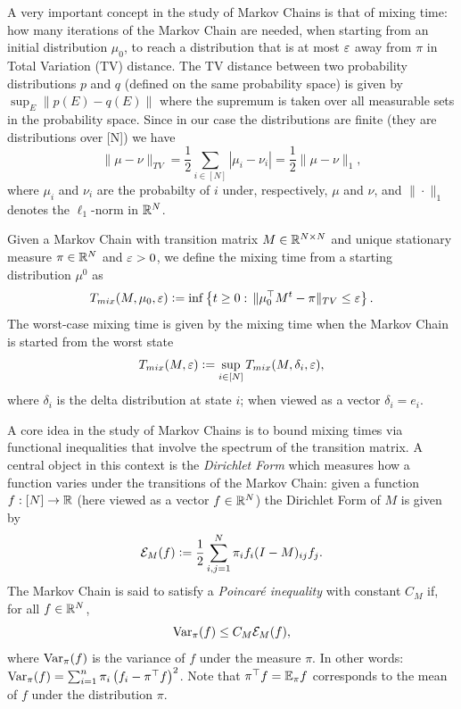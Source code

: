 A very important concept in the study of Markov Chains is that of mixing time: how many iterations of the Markov Chain are needed, when starting from an initial distribution $\mu_0$, to reach a distribution that is at most $\varepsilon$ away from $\pi$ in Total Variation (TV) distance. The TV distance between two probability distributions $p$ and $q$ (defined on the same probability space) is given by $\sup_E\|p(E)-q(E)\|$ where the supremum is taken over all measurable sets in the probability space. Since in our case the distributions are finite (they are distributions over [N]) we have
\[
\|\mu-\nu\|_{TV} =\frac12\sum_{i\in [N]}\left| \mu_i - \nu_i \right| = \frac12\|\mu-\nu\|_{1},
\]
where $\mu_i$ and $\nu_i$ are the probabilty of $i$ under, respectively, $\mu$ and $\nu$, and $\|\cdot\|_1$ denotes the $\ell_1$-norm in $\mathbb{R}^N$.

\begin{definition}
Given a Markov Chain with transition matrix $M\in\mathbb{R}^{N\times N}$ and unique stationary measure $\pi\in\mathbb{R}^N$ and $\varepsilon>0$, we define the mixing time from a starting distribution $\mu^0$ as
\[
T_{mix}(M,\mu_0,\varepsilon) \mathrel{\mathop:}= \inf\left\{t\geq 0:\,\|\mu_0^\top M^t - \pi\|_{TV}\leq \varepsilon\right\}.
\]
The worst-case mixing time is given by the mixing time when the Markov Chain is started from the worst state
\[
T_{mix}(M,\varepsilon) \mathrel{\mathop:}= \sup_{i\in[N]} T_{mix}(M,\delta_i,\varepsilon),
\]
where $\delta_i$ is the delta distribution at state $i$; when viewed as a vector $\delta_i=e_i$.
\end{definition}

A core idea in the study of Markov Chains is to bound mixing times via functional inequalities that involve the spectrum of the transition matrix. A central object in this context is the {\em Dirichlet Form} which measures how a function varies under the transitions of the Markov Chain: given a function $f:[N]\to\mathbb{R}$ (here viewed as a vector $f\in\mathbb{R}^N$) the Dirichlet Form of $M$ is given by
\begin{equation}
\mathcal{E}_M(f) \mathrel{\mathop:}= \frac12 \sum_{i,j=1}^N \pi_i f_i (I-M)_{ij}f_j.     
\end{equation}
The Markov Chain is said to satisfy a {\em Poincar\'{e} inequality} with constant $C_M$ if, for all $f\in\mathbb{R}^{N}$,
\begin{equation}\label{eq:poincare-for-MC}
    \operatorname{Var}_{\pi}(f) \leq C_M \mathcal{E}_M(f),
\end{equation}
where $\operatorname{Var}_{\pi}(f)$ is the variance of $f$ under the measure $\pi$. In other words: $ \operatorname{Var}_{\pi}(f) = \sum_{i=1}^n \pi_i\left( f_i - \pi^\top f \right)^2$. Note that $\pi^\top f=\mathbb{E}_\pi f$ corresponds to the mean of $f$ under the distribution $\pi$.

